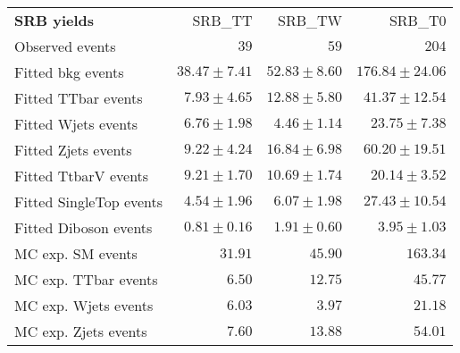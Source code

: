 

\begin{table}
\begin{center}
\setlength{\tabcolsep}{0.0pc}
{\small
\begin{tabular*}{\textwidth}{@{\extracolsep{\fill}}lrrr}
\noalign{\smallskip}\hline\noalign{\smallskip}
{\bf SRB yields}           & SRB\_TT            & SRB\_TW            & SRB\_T0              \\[-0.05cm]
\noalign{\smallskip}\hline\noalign{\smallskip}
Observed events          & $39$              & $59$              & $204$                    \\
\noalign{\smallskip}\hline\noalign{\smallskip}
Fitted bkg events         & $38.47 \pm 7.41$          & $52.83 \pm 8.60$          & $176.84 \pm 24.06$              \\
\noalign{\smallskip}\hline\noalign{\smallskip}
        Fitted TTbar events         & $7.93 \pm 4.65$          & $12.88 \pm 5.80$          & $41.37 \pm 12.54$              \\
        Fitted Wjets events         & $6.76 \pm 1.98$          & $4.46 \pm 1.14$          & $23.75 \pm 7.38$              \\
        Fitted Zjets events         & $9.22 \pm 4.24$          & $16.84 \pm 6.98$          & $60.20 \pm 19.51$              \\
        Fitted TtbarV events         & $9.21 \pm 1.70$          & $10.69 \pm 1.74$          & $20.14 \pm 3.52$              \\
        Fitted SingleTop events         & $4.54 \pm 1.96$          & $6.07 \pm 1.98$          & $27.43 \pm 10.54$              \\
        Fitted Diboson events         & $0.81 \pm 0.16$          & $1.91 \pm 0.60$          & $3.95 \pm 1.03$              \\
 \noalign{\smallskip}\hline\noalign{\smallskip}
MC exp. SM events              & $31.91$          & $45.90$          & $163.34$              \\
\noalign{\smallskip}\hline\noalign{\smallskip}
        MC exp. TTbar events         & $6.50$          & $12.75$          & $45.77$              \\
        MC exp. Wjets events         & $6.03$          & $3.97$          & $21.18$              \\
        MC exp. Zjets events         & $7.60$          & $13.88$          & $54.01$              \\

\end{tabular*}}
\end{center}
\end{table}
